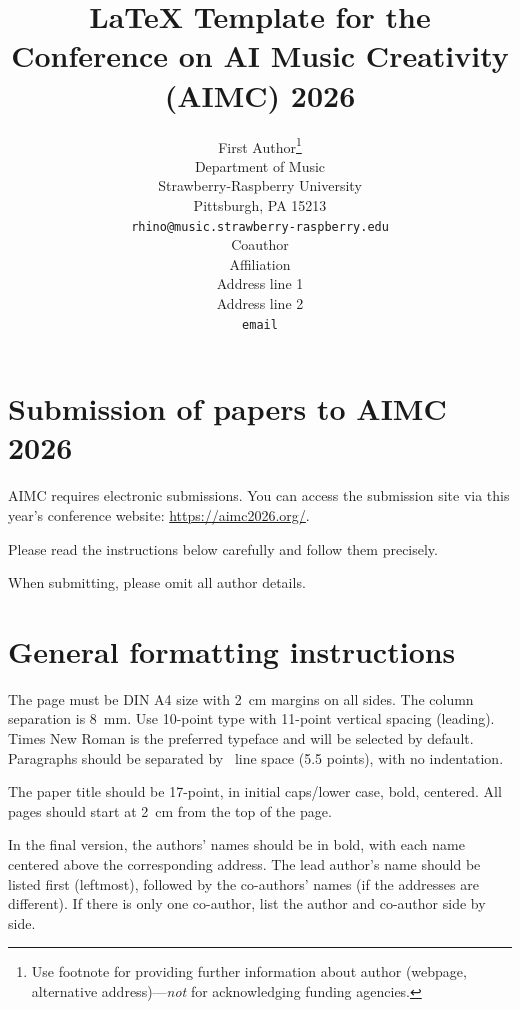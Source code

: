 \documentclass{aimc2026}
\title{\LaTeX{} Template for the Conference on AI Music Creativity (AIMC) 2026}
\author{%
  First Author\thanks{Use footnote for providing further information
    about author (webpage, alternative address)---\emph{not} for acknowledging
    funding agencies.} \\
  Department of Music\\
  Strawberry-Raspberry University\\
  Pittsburgh, PA 15213 \\
  \texttt{rhino@music.strawberry-raspberry.edu} \\
  \And
  Coauthor \\
  Affiliation \\
  Address line 1 \\
  Address line 2 \\
  \texttt{email} \\
}
\begin{document}

\aimcnotice %

\section{Submission of papers to AIMC 2026}
\label{sec:submissions}

AIMC requires electronic submissions. You can access the submission site via this year's conference website:  \url{https://aimc2026.org/}.

Please read the instructions below carefully and follow them precisely.

When submitting, please omit all author details.


\section{General formatting instructions}
\label{sec:general_instructions}

The page must be DIN A4 size with 2~cm margins on all sides.
The column separation is 8~mm. Use 10-point
type with 11-point vertical spacing (leading). Times New Roman is the
preferred typeface and will be selected by default.
Paragraphs should be separated by ~line space (5.5 points), with no
indentation.

The paper title should be 17-point, in initial caps/lower case, bold, centered.
All pages should start at 2~cm from the
top of the page.

In the final version, the authors' names should be in bold, with each name centered above the corresponding address. The lead author's name should be listed first (leftmost), followed by the co-authors' names (if the addresses are different). If there is only one co-author, list the author and co-author side by side.
\end{document}
